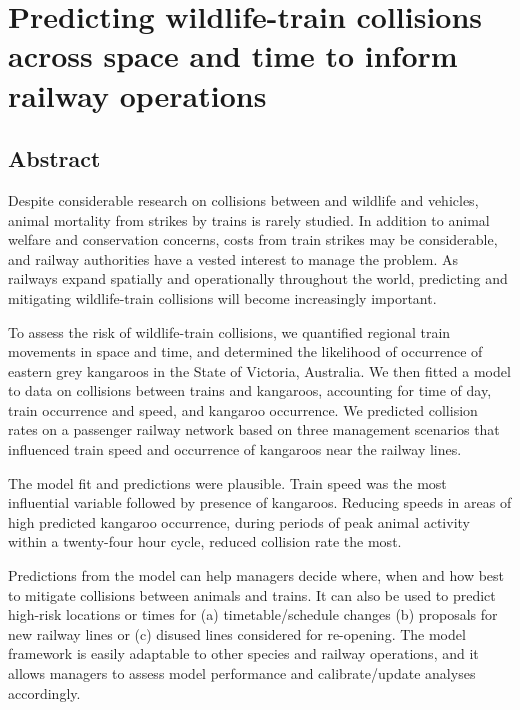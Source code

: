 \chapter{Predicting wildlife-train collisions across space and time to inform railway operations}\label{sec:train}
\newpage

\begin{localsize}{11}
\section*{\centering Abstract}

Despite considerable research on collisions between and wildlife and vehicles, animal mortality from strikes by trains is rarely studied.  In addition to animal welfare and conservation concerns, costs from train strikes may be considerable, and railway authorities have a vested interest to manage the problem. As railways expand spatially and operationally throughout the world, predicting and mitigating wildlife-train collisions will become increasingly important.

To assess the risk of wildlife-train collisions, we quantified regional train movements in space and time, and determined the likelihood of occurrence of eastern grey kangaroos in the State of Victoria, Australia. We then fitted a model to data on collisions between trains and kangaroos, accounting for time of day, train occurrence and speed, and kangaroo occurrence.  We predicted collision rates on a passenger railway network based on three management scenarios that influenced train speed and occurrence of kangaroos near the railway lines.

The model fit and predictions were plausible.  Train speed was the most influential variable followed by presence of kangaroos.  Reducing speeds in areas of high predicted kangaroo occurrence, during periods of peak animal activity within a twenty-four hour cycle, reduced collision rate the most.

Predictions from the model can help managers decide where, when and how best to mitigate collisions between animals and trains.  It can also be used to predict high-risk locations or times for (a) timetable/schedule changes (b) proposals for new railway lines or (c) disused lines considered for re-opening. The model framework is easily adaptable to other species and railway operations, and it allows managers to assess model performance and calibrate/update analyses accordingly.

\end{localsize}

